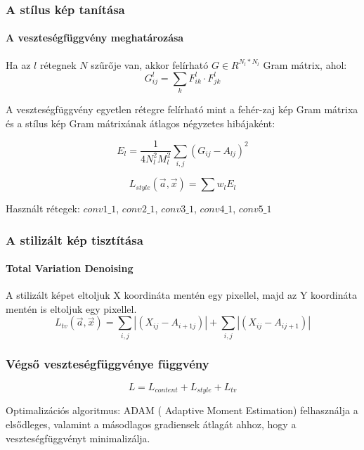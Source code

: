 \documentclass{beamer}
\begin{document}
	\begin{frame}
		\frametitle{A stílus kép tanítása}
		\framesubtitle{A veszteségfüggvény meghatározása}
		
		Ha az \(l\) rétegnek \(N\) szűrője van, akkor felírható \(G \in R^{N_l*N_l}\) Gram mátrix, ahol:
		\begin{equation}
			G^l_{ij} = \sum_{k} F^l_{ik} \cdot F^l_{jk}
		\end{equation}
		
		A veszteségfüggvény egyetlen rétegre felírható mint a fehér-zaj kép Gram mátrixa és a stílus kép Gram mátrixának átlagos négyzetes hibájaként:
		 
		\begin{equation}
			E_l = \frac{1}{4N^2_l M^2_l} \sum_{i,j} (G_{ij} - A_{lj})^2
		\end{equation}
		
		\begin{equation}
			L_{style}(\vec{a}, \vec{x}) = \sum w_lE_l
		\end{equation}
		
		Használt rétegek: \(conv1\_1\), \(conv2\_1\), \(conv3\_1\), \(conv4\_1\), \(conv5\_1\)
		
	\end{frame}

	\begin{frame}
		\frametitle{A stilizált kép tisztítása}
		\framesubtitle{Total Variation Denoising}
		
		A stilizált képet eltoljuk X koordináta mentén egy pixellel, majd az Y koordináta mentén is eltoljuk egy pixellel.
		\begin{equation}
			L_{tv}(\vec{a}, \vec{x}) = \sum_{i,j} \left|(X_{ij} - A_{{i+1}j})\right| + \sum_{i, j} \left|(X_{ij} - A_{i {j+1}})\right|
		\end{equation}
	\end{frame}

	\begin{frame}
		\frametitle{Végső veszteségfüggvénye függvény}
		
		\begin{equation}
			L = L_{content} + L_{style} + L_{tv}
		\end{equation}
		
		Optimalizációs algoritmus: ADAM ( Adaptive Moment Estimation) felhasználja a elsődleges, valamint a másodlagos gradiensek átlagát ahhoz, hogy a veszteségfüggvényt minimalizálja.
		
	\end{frame}
\end{document}
